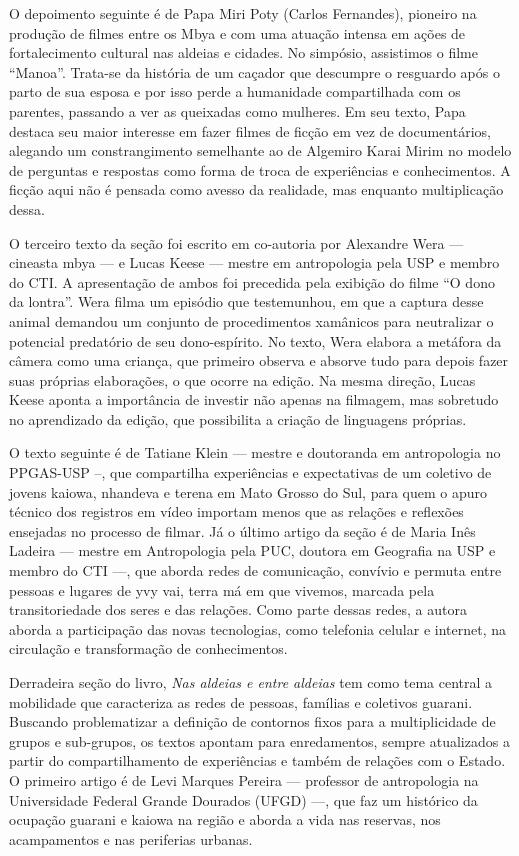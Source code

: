O depoimento seguinte é de Papa Miri Poty (Carlos
Fernandes), pioneiro na produção de filmes entre os Mbya e com uma
atuação intensa em ações de fortalecimento cultural nas aldeias e
cidades. No simpósio, assistimos o filme ``Manoa''. Trata-se da história
de um caçador que descumpre o resguardo após o parto de sua esposa e
por isso perde a humanidade compartilhada com os parentes, passando a
ver as queixadas como mulheres. Em seu texto, Papa destaca seu maior
interesse em fazer filmes de ficção em vez de documentários, alegando
um constrangimento semelhante ao de Algemiro Karai Mirim no modelo de
perguntas e respostas como forma de troca de experiências e
conhecimentos. A ficção aqui não é pensada como avesso da realidade,
mas enquanto multiplicação dessa. 

O terceiro texto da seção foi escrito em co-autoria por Alexandre Wera —
cineasta mbya — e Lucas Keese — mestre em antropologia pela USP e
membro do CTI. A apresentação de ambos foi precedida pela exibição do
filme ``O dono da lontra''. Wera filma um episódio que testemunhou, em
que a captura desse animal demandou um conjunto de procedimentos
xamânicos para neutralizar o potencial predatório de seu dono-espírito.
No texto, Wera elabora a metáfora da câmera como uma criança, que
primeiro observa e absorve tudo para depois fazer suas próprias
elaborações, o que ocorre na edição. Na mesma direção, Lucas Keese
aponta a importância de investir não apenas na filmagem, mas sobretudo
no aprendizado da edição, que possibilita a criação de linguagens
próprias. 

O texto seguinte é de Tatiane Klein — mestre e doutoranda em
antropologia no PPGAS-USP –, que compartilha experiências e
expectativas de um coletivo de jovens kaiowa, nhandeva e terena em Mato
Grosso do Sul, para quem o apuro técnico dos registros em vídeo
importam menos que as relações e reflexões ensejadas no processo de
filmar. Já o último artigo da seção é de Maria Inês Ladeira — mestre em
Antropologia pela PUC, doutora em Geografia na USP e membro do CTI —,
que aborda redes de comunicação, convívio e permuta entre pessoas e
lugares de yvy vai, terra má em que vivemos, marcada pela
transitoriedade dos seres e das relações. Como parte dessas redes, a
autora aborda a participação das novas tecnologias, como telefonia
celular e internet, na circulação e transformação de conhecimentos.

Derradeira seção do livro, \emph{Nas aldeias e entre aldeias} tem como tema
central a mobilidade que caracteriza as redes de pessoas, famílias e
coletivos guarani. Buscando problematizar a definição de contornos
fixos para a multiplicidade de grupos e sub-grupos, os textos apontam
para enredamentos, sempre atualizados a partir do compartilhamento de
experiências e também de relações com o Estado. O primeiro artigo é de
Levi Marques Pereira — professor de antropologia na Universidade
Federal Grande Dourados (UFGD) —, que faz um histórico da ocupação
guarani e kaiowa na região e aborda a vida nas reservas, nos
acampamentos e nas periferias urbanas. 

